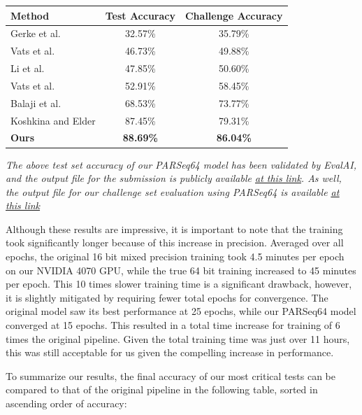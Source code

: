 \documentclass[11pt, letterpaper]{article}
\begin{document}
\begin{center}
  \begin{tabular}{|l|c|c|}
    \hline
    \textbf{Method} & \textbf{Test Accuracy} & \textbf{Challenge Accuracy} \\
    \hline
    Gerke et al.  & 32.57\% & 35.79\% \\
    Vats et al.  & 46.73\% & 49.88\% \\
    Li et al.    & 47.85\% & 50.60\% \\
    Vats et al.  & 52.91\% & 58.45\% \\
    Balaji et al. & 68.53\% & 73.77\% \\
    \hline
    Koshkina and Elder & 87.45\% & 79.31\% \\
    \hline
    \textbf{Ours} & \textbf{88.69\%} & \textbf{86.04\%} \\
    \hline
  \end{tabular}
\end{center}

\begin{center}
  \textit{The above test set accuracy of our PARSeq64 model has been validated by EvalAI, and the output file for the submission is publicly available \underline{\href{https://evalai.s3.amazonaws.com/media/submission_files/submission_503522/62c51842-1475-414e-94cf-373e5d51920e.txt}{at this link}}. As well, the output file for our challenge set evaluation using PARSeq64 is available \underline{\href{https://evalai.s3.amazonaws.com/media/submission_files/submission_503523/1b5b6636-a642-4490-9bd8-67120830fe24.txt}{at this link}}}
\end{center}

Although these results are impressive, it is important to note that the training took significantly longer because of this increase in precision. Averaged over all epochs, the original 16 bit mixed precision training took 4.5 minutes per epoch on our NVIDIA 4070 GPU, while the true 64 bit training increased to 45 minutes per epoch. This 10 times slower training time is a significant drawback, however, it is slightly mitigated by requiring fewer total epochs for convergence. The original model saw its best performance at 25 epochs, while our PARSeq64 model converged at 15 epochs. This resulted in a total time increase for training of 6 times the original pipeline. Given the total training time was just over 11 hours, this was still acceptable for us given the compelling increase in performance. 

To summarize our results, the final accuracy of our most critical tests can be compared to that of the original pipeline in the following table, sorted in ascending order of accuracy:
\end{document}
